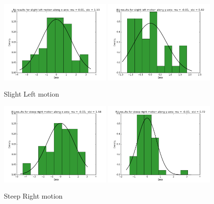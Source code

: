 \documentclass[10pt]{scrartcl}
\begin{document}
\begin{figure}[H]
\centering
\caption{Slight Left motion}
\label{fig:13}
\includegraphics[width=0.49\textwidth ]{images/pca_slight_left_x_data}
\includegraphics[width=0.49\textwidth]{images/pca_slight_left_y_data}
\end{figure}

\begin{figure}[H]
\centering
\caption{Steep Right motion}
\label{fig:14}
\includegraphics[width=0.49\textwidth ]{images/pca_steep_right_x_data}
\includegraphics[width=0.49\textwidth]{images/pca_steep_right_y_data}
\end{figure}
\end{document}

